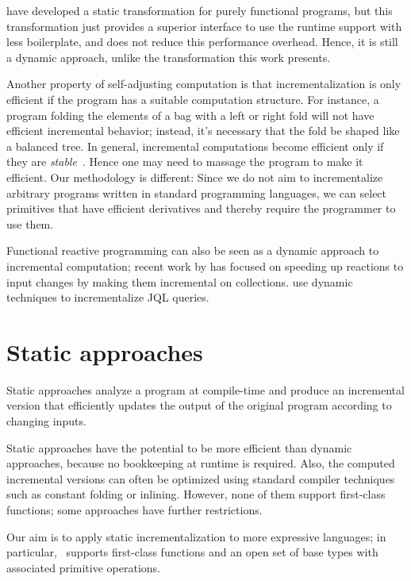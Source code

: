 \citet{Chen11} have developed a static transformation for purely
functional programs, but this transformation just provides a superior interface to use
the runtime support with less boilerplate, and does not reduce
this performance overhead. Hence, it is still a dynamic approach, unlike
the transformation this work presents.

Another property of self-adjusting computation
is that incrementalization is only efficient if the program has a suitable
computation structure. For instance, a program
folding the elements of a bag with a left or right fold will not
have efficient incremental behavior; instead, it's necessary that
the fold be shaped like a balanced tree. In general,
incremental computations become efficient only if they are \emph{stable}~\citep{Acar05}.
Hence one may need to massage the program to make it efficient. Our methodology is 
different: Since we do not aim to incrementalize arbitrary programs written in standard
programming languages, we can select primitives that have efficient derivatives and thereby require 
the programmer to use them.

Functional reactive programming \citep{Elliott:1997:FRA:258948.258973}
can also be seen as a dynamic approach to incremental computation;
recent work by \citet{Maier2013} has
focused on speeding up reactions to input changes by making them
incremental on collections. \citet{Willis08} use dynamic techniques
 to incrementalize JQL queries.

\section{Static approaches}
Static approaches analyze a program at compile-time and produce an
incremental version that efficiently updates the output
of the original program according to changing inputs.

Static approaches have the potential to be more efficient than dynamic approaches,
because no bookkeeping at runtime is required. Also, the computed incremental
versions can often be optimized using standard compiler techniques
such as constant folding or inlining.
However, none of them support first-class functions; some
approaches have further restrictions.

Our aim is to apply static incrementalization to more expressive languages;
in particular, \ILC\ supports first-class functions and an open
set of base types with associated primitive operations.

